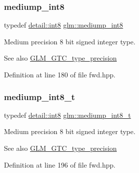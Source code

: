 \subsubsection{\texorpdfstring{mediump\+\_\+int8}{mediump\_int8}}
{\footnotesize\ttfamily typedef \hyperlink{namespaceglm_1_1detail_a04b526a8d7a9b455602a0afa78c531e0}{detail\+::int8} \hyperlink{group__gtc__type__precision_ga3ee8faab2278c44c5785af04b7b18a14}{glm\+::mediump\+\_\+int8}}

Medium precision 8 bit signed integer type. \begin{DoxySeeAlso}{See also}
\hyperlink{group__gtc__type__precision}{G\+L\+M\+\_\+\+G\+T\+C\+\_\+type\+\_\+precision} 
\end{DoxySeeAlso}


Definition at line 180 of file fwd.\+hpp.

\mbox{\label{group__gtc__type__precision_ga626ac5f73d3538e62a879d6c56abfb36}} 
\subsubsection{\texorpdfstring{mediump\+\_\+int8\+\_\+t}{mediump\_int8\_t}}
{\footnotesize\ttfamily typedef \hyperlink{namespaceglm_1_1detail_a04b526a8d7a9b455602a0afa78c531e0}{detail\+::int8} \hyperlink{group__gtc__type__precision_ga626ac5f73d3538e62a879d6c56abfb36}{glm\+::mediump\+\_\+int8\+\_\+t}}

Medium precision 8 bit signed integer type. \begin{DoxySeeAlso}{See also}
\hyperlink{group__gtc__type__precision}{G\+L\+M\+\_\+\+G\+T\+C\+\_\+type\+\_\+precision} 
\end{DoxySeeAlso}


Definition at line 196 of file fwd.\+hpp.

\mbox{\label{group__gtc__type__precision_ga6745262ef6a6fdb8637b2387ef924828}} 
